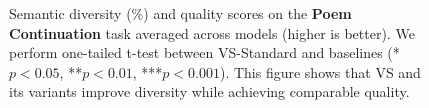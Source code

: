 \begin{figure}[!htbp]
\begin{subfigure}[t]{0.48\textwidth}
      \label{fig:poem_creative_quality}
  \end{subfigure}
  \caption{
  Semantic diversity (\%) and quality scores on the \textbf{Poem Continuation} task averaged across models (higher is better). We perform one-tailed t-test between VS-Standard and baselines (*$p < 0.05$, **$p < 0.01$, ***$p < 0.001$). This figure shows that VS and its variants improve diversity while achieving  comparable quality.
  }
  \label{fig:poem_continuation}
\end{figure}

